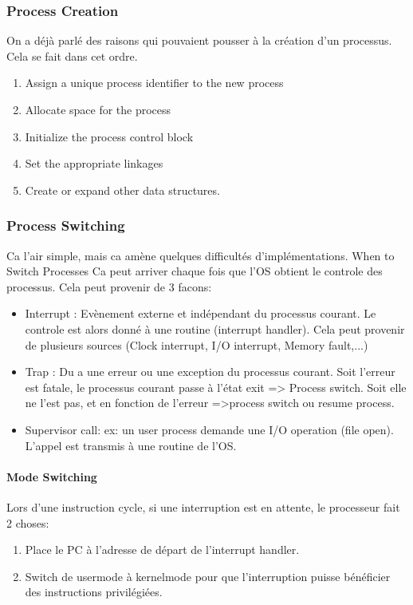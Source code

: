 \subsubsection{Process Creation}
On a déjà parlé des raisons qui pouvaient pousser à la création d'un processus. Cela se fait dans cet ordre.
\begin{enumerate}
  \item Assign a unique process identifier to the new process
  \item Allocate space for the process
  \item Initialize the process control block
  \item Set the appropriate linkages
  \item Create or expand other data structures.
\end{enumerate}

\subsubsection{Process Switching}
Ca l'air simple, mais ca amène quelques difficultés d'implémentations.
When to Switch Processes
Ca peut arriver chaque fois que l'OS obtient le controle des processus. Cela peut provenir de 3 facons:
\begin{itemize}
  \item Interrupt : Evènement externe et indépendant du processus courant. Le controle est alors donné à une routine (interrupt handler). Cela peut provenir de plusieurs sources (Clock interrupt, I/O interrupt, Memory fault,...)
  \item Trap : Du a une erreur ou une exception du processus courant. Soit l'erreur est fatale, le processus courant passe à l'état exit => Process switch. Soit elle ne l'est pas, et en fonction de l'erreur =>process switch ou resume process.
  \item Supervisor call: ex: un user process demande une I/O operation (file open). L'appel est transmis à une routine de l'OS.
\end{itemize}
\paragraph{Mode Switching}
Lors d'une instruction cycle, si une interruption est en attente, le processeur fait 2 choses:
\begin{enumerate}
  \item Place le PC à l'adresse de départ de l'interrupt handler.
  \item Switch de usermode à kernelmode pour que l'interruption puisse bénéficier des instructions privilégiées.
\end{enumerate}
